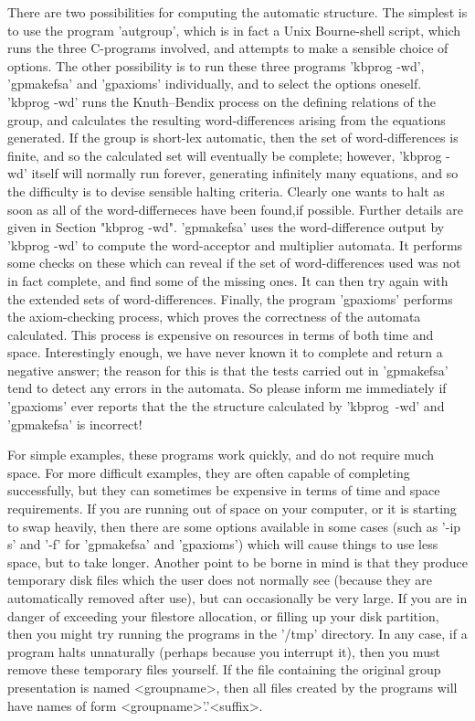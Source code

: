 There are two possibilities for computing the automatic structure.
The simplest is to use the program 'autgroup', which is in fact a
Unix Bourne-shell script, which runs the three C-programs involved,
and attempts to make a sensible choice of options.
The other possibility is to run these three programs 'kbprog -wd',
'gpmakefsa' and 'gpaxioms' individually, and to select the options oneself.
'kbprog -wd' runs the Knuth--Bendix process on the defining relations of the
group, and calculates the resulting word-differences arising from the
equations generated. If the group is short-lex automatic, then the set
of word-differences is finite, and so the calculated set will eventually
be complete; however, 'kbprog -wd' itself will normally run forever, generating
infinitely many equations, and so the difficulty is to devise sensible
halting criteria. Clearly one wants to halt as soon as all of the
word-differneces have been found,if possible. Further details are given in
Section "kbprog -wd". 'gpmakefsa' uses the word-difference output by
'kbprog -wd' to compute the word-acceptor and multiplier automata.
It performs some checks on these which can reveal if the set of
word-differences used was not in fact complete, and find some of the
missing ones. It can then try again with the extended sets of
word-differences. Finally, the program 'gpaxioms' performs the
axiom-checking process, which proves the correctness of the automata
calculated. This process is expensive on resources in terms of both time
and space. Interestingly enough, we have never known it to complete and
return a negative answer; the reason for this is that the tests carried
out in 'gpmakefsa' tend to detect any errors in the automata.
So please inform me immediately if 'gpaxioms' ever reports that the
the structure calculated by 'kbprog\ -wd' and 'gpmakefsa' is incorrect!

For simple examples, these programs work quickly, and do not require
much space. For more difficult examples, they are often capable of
completing successfully, but they can sometimes be expensive in terms of
time and space requirements. If you are running out of space on your computer,
or it is starting to swap heavily, then there are some options available
in some cases (such as '-ip s' and '-f' for 'gpmakefsa' and 'gpaxioms')
which will cause things to use less space, but to take longer.
Another point to be borne in mind is that they produce temporary disk
files which the user does not normally see (because they are
automatically removed after use), but can occasionally be very large.
If you are in danger of exceeding your filestore allocation, or filling up
your disk partition, then you might try running the programs in the '/tmp'
directory. In any case, if a program halts unnaturally (perhaps because
you interrupt it), then you must remove these temporary files yourself.
If the file containing the original group presentation is  named
<groupname>, then all files created by the programs will have names of
form <groupname>'.'<suffix>.

